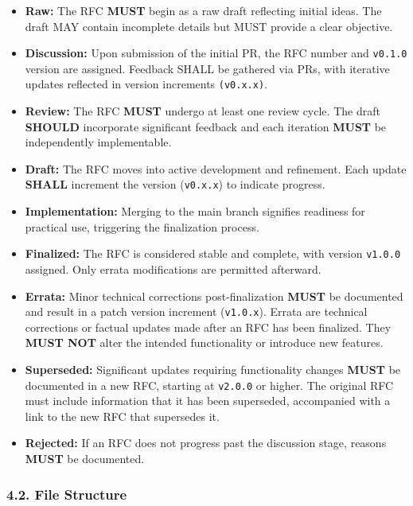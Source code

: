 \begin{itemize}
\tightlist
\item
  \textbf{Raw:} The RFC \textbf{MUST} begin as a raw draft reflecting
  initial ideas. The draft MAY contain incomplete details but MUST
  provide a clear objective.
\item
  \textbf{Discussion:} Upon submission of the initial PR, the RFC number
  and \texttt{v0.1.0} version are assigned. Feedback SHALL be gathered
  via PRs, with iterative updates reflected in version increments
  \texttt{(v0.x.x)}.
\item
  \textbf{Review:} The RFC \textbf{MUST} undergo at least one review
  cycle. The draft \textbf{SHOULD} incorporate significant feedback and
  each iteration \textbf{MUST} be independently implementable.
\item
  \textbf{Draft:} The RFC moves into active development and refinement.
  Each update \textbf{SHALL} increment the version (\texttt{v0.x.x}) to
  indicate progress.
\item
  \textbf{Implementation:} Merging to the main branch signifies
  readiness for practical use, triggering the finalization process.
\item
  \textbf{Finalized:} The RFC is considered stable and complete, with
  version \texttt{v1.0.0} assigned. Only errata modifications are
  permitted afterward.
\item
  \textbf{Errata:} Minor technical corrections post-finalization
  \textbf{MUST} be documented and result in a patch version increment
  (\texttt{v1.0.x}). Errata are technical corrections or factual updates
  made after an RFC has been finalized. They \textbf{MUST NOT} alter the
  intended functionality or introduce new features.
\item
  \textbf{Superseded:} Significant updates requiring functionality
  changes \textbf{MUST} be documented in a new RFC, starting at
  \texttt{v2.0.0} or higher. The original RFC must include information
  that it has been superseded, accompanied with a link to the new RFC
  that supersedes it.
\item
  \textbf{Rejected:} If an RFC does not progress past the discussion
  stage, reasons \textbf{MUST} be documented.
\end{itemize}

\subsubsection{4.2. File Structure}\label{file-structure}

